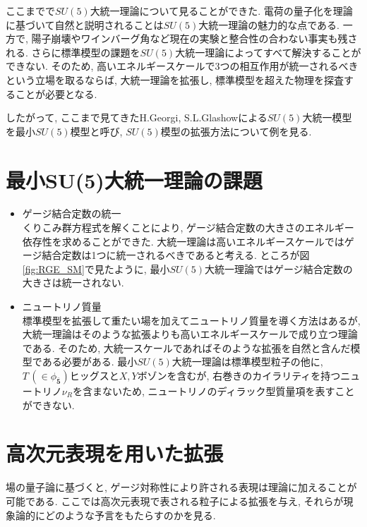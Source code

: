 %
%
ここまでで$SU(5)$大統一理論について見ることができた.
電荷の量子化を理論に基づいて自然と説明されることは$SU(5)$大統一理論の魅力的な点である.
一方で, 陽子崩壊やワインバーグ角など現在の実験と整合性の合わない事実も残される.
さらに標準模型の課題を$SU(5)$大統一理論によってすべて解決することができない.
そのため, 高いエネルギースケールで3つの相互作用が統一されるべきという立場を取るならば, 大統一理論を拡張し, 標準模型を超えた物理を探査することが必要となる.

したがって, ここまで見てきたH.Georgi, S.L.Glashowによる$SU(5)$大統一模型を最小$SU(5)$模型と呼び, $SU(5)$模型の拡張方法について例を見る.
\section{最小SU(5)大統一理論の課題}
\begin{itemize}
  \item ゲージ結合定数の統一\\
        くりこみ群方程式を解くことにより, ゲージ結合定数の大きさのエネルギー依存性を求めることができた.
        大統一理論は高いエネルギースケールではゲージ結合定数は1つに統一されるべきであると考える.
        ところが図\ref{fig:RGE_SM}で見たように, 最小$SU(5)$大統一理論ではゲージ結合定数の大きさは統一されない.
  \item ニュートリノ質量\\
        標準模型を拡張して重たい場を加えてニュートリノ質量を導く方法はあるが, 大統一理論はそのような拡張よりも高いエネルギースケールで成り立つ理論である.
        そのため, 大統一スケールであればそのような拡張を自然と含んだ模型である必要がある.
        最小$SU(5)$大統一理論は標準模型粒子の他に, $T \,(\in \phi_{\bar{\bm{5}}})$ヒッグスと$X,Y$ボゾンを含むが, 右巻きのカイラリティを持つニュートリノ$\nu_R$を含まないため, ニュートリノのディラック型質量項を表すことができない. 
\end{itemize}
\section{高次元表現を用いた拡張}
場の量子論に基づくと, ゲージ対称性により許される表現は理論に加えることが可能である.
ここでは高次元表現で表される粒子による拡張を与え, それらが現象論的にどのような予言をもたらすのかを見る.

